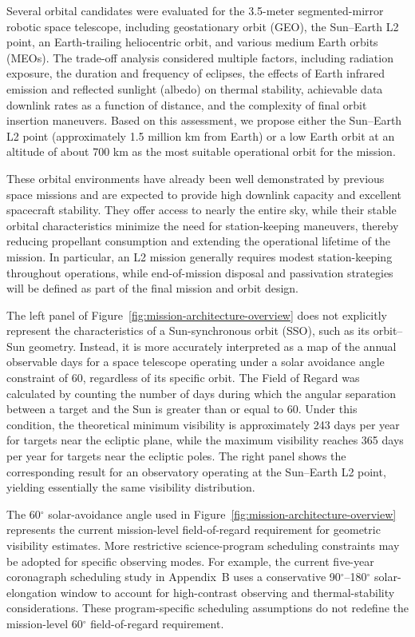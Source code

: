 Several orbital candidates were evaluated for the 3.5-meter segmented-mirror robotic space telescope, including geostationary orbit (GEO), the Sun--Earth L2 point, an Earth-trailing heliocentric orbit, and various medium Earth orbits (MEOs). The trade-off analysis considered multiple factors, including radiation exposure, the duration and frequency of eclipses, the effects of Earth infrared emission and reflected sunlight (albedo) on thermal stability, achievable data downlink rates as a function of distance, and the complexity of final orbit insertion maneuvers. Based on this assessment, we propose either the Sun--Earth L2 point (approximately 1.5 million km from Earth) or a low Earth orbit at an altitude of about 700 km as the most suitable operational orbit for the mission.

These orbital environments have already been well demonstrated by previous space missions and are expected to provide high downlink capacity and excellent spacecraft stability. They offer access to nearly the entire sky, while their stable orbital characteristics minimize the need for station-keeping maneuvers, thereby reducing propellant consumption and extending the operational lifetime of the mission. In particular, an L2 mission generally requires modest station-keeping throughout operations, while end-of-mission disposal and passivation strategies will be defined as part of the final mission and orbit design.

The left panel of Figure~\ref{fig:mission-architecture-overview} does not explicitly represent the characteristics of a Sun-synchronous orbit (SSO), such as its orbit--Sun geometry. Instead, it is more accurately interpreted as a map of the annual observable days for a space telescope operating under a solar avoidance angle constraint of 60\textdegree{}, regardless of its specific orbit. The Field of Regard was calculated by counting the number of days during which the angular separation between a target and the Sun is greater than or equal to 60\textdegree{}. Under this condition, the theoretical minimum visibility is approximately 243 days per year for targets near the ecliptic plane, while the maximum visibility reaches 365 days per year for targets near the ecliptic poles. The right panel shows the corresponding result for an observatory operating at the Sun--Earth L2 point, yielding essentially the same visibility distribution.

The 60$^\circ$ solar-avoidance angle used in Figure~\ref{fig:mission-architecture-overview} represents the current mission-level field-of-regard requirement for geometric visibility estimates. More restrictive science-program scheduling constraints may be adopted for specific observing modes. For example, the current five-year coronagraph scheduling study in Appendix~B uses a conservative 90$^\circ$--180$^\circ$ solar-elongation window to account for high-contrast observing and thermal-stability considerations. These program-specific scheduling assumptions do not redefine the mission-level 60$^\circ$ field-of-regard requirement.


